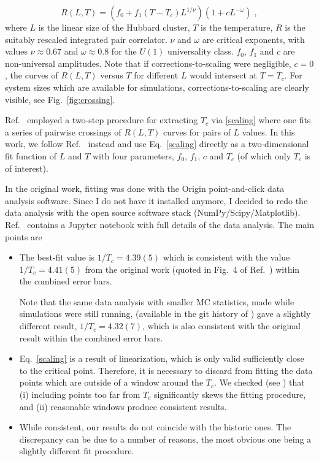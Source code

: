 \begin{equation}
R(L, T) = \left(f_0 + f_1 (T-T_c) L^{1/\nu} \right) \left(1 + c L^{-\omega} \right) \;,
\label{scaling}
\end{equation}
%
where $L$ is the linear size of the Hubbard cluster, $T$ is the temperature, 
$R$ is the suitably rescaled integrated pair correlator. $\nu$ and $\omega$
are critical exponents, with values $\nu \approx 0.67$ and
$\omega \approx 0.8$ for the $U(1)$ universality class. $f_0$, $f_1$ and $c$
are non-universal amplitudes. Note that if corrections-to-scaling were negligible,
$c = 0$, the curves of $R(L, T)$ versus $T$ for different $L$ would intersect at 
$T = T_c$. For system sizes which are available for simulations,
corrections-to-scaling are clearly visible, see Fig.\ \ref{fig:crossing}.

Ref.\ \cite{PRL:2006} employed a two-step procedure for extracting $T_c$ via
\eqref{scaling} where one fits a series of pairwise crossings of $R(L, T)$ curves
for pairs of $L$ values. In this work, we follow Ref.\ \cite{Goulko:2010} instead
and use Eq.\ \eqref{scaling} directly as a two-dimensional fit function
of $L$ and $T$ with four parameters, $f_0$, $f_1$, $c$ and $T_c$ (of which only
$T_c$ is of interest).


In the original work, fitting was done with the Origin point-and-click
data analysis software. Since I do not have it installed anymore, I decided
to redo the data analysis with the open source software stack
(NumPy/Scipy/Matplotlib). Ref.\ \cite{GH:2020} contains a Jupyter notebook
with full details of the data analysis. The main points are
\begin{itemize}
\item The best-fit value is $1/T_c = 4.39(5)$ which is consistent with the value
$1/T_c = 4.41(5)$ from the original work (quoted in Fig.\ 4 of Ref.\ \cite{NJP:2006})
within the combined error bars.

Note that the same data analysis with smaller MC statistics, made while
simulations were still running, (available in the git history of \cite{GH:2020})
gave a slightly different result, $1/T_c = 4.32(7)$, which is also consistent
with the original result within the combined error bars.


\item Eq.\ \eqref{scaling} is a result of linearization, which is only valid
sufficiently close to the critical point. Therefore, it is necessary to discard from
fitting the data points which are outside of a window around the $T_c$. We checked
(see \cite{GH:2020}) that (i) including points too far from $T_c$ significantly
skews the fitting procedure, and (ii) reasonable windows produce consistent results.

\item While consistent, our results do not coincide with the historic ones. 
The discrepancy can be due to a number of reasons, the most obvious one being
a slightly different fit procedure. 

\end{itemize}

